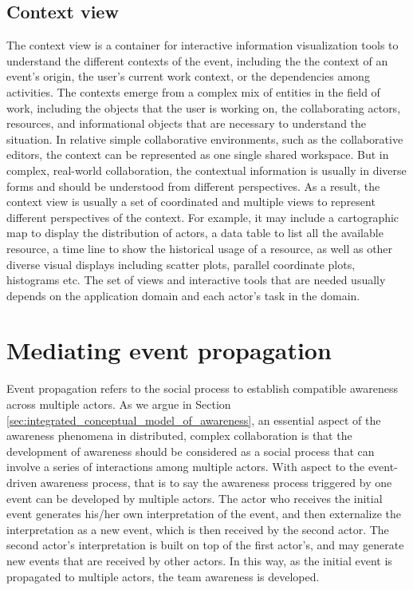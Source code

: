 \subsection{Context view} %
\label{sub:context_view}
The context view is a container for interactive information visualization tools to understand the different contexts of the event, including the the context of an event's origin, the user's current work context, or the dependencies among activities. The contexts emerge from a complex mix of entities in the field of work, including the objects that the user is working on, the collaborating actors, resources, and informational objects that are necessary to understand the situation. In relative simple collaborative environments, such as the collaborative editors, the context can be represented as one single shared workspace. But in complex, real-world collaboration, the contextual information is usually in diverse forms and should be understood from different perspectives. As a result, the context view is usually a set of coordinated and multiple views to represent different perspectives of the context. For example, it may include a cartographic map to display the distribution of actors, a data table to list all the available resource, a time line to show the historical usage of a resource, as well as other diverse visual displays including scatter plots, parallel coordinate plots, histograms etc. The set of views and interactive tools that are needed usually depends on the application domain and each actor's task in the domain.

\section{Mediating event propagation} %
\label{sec:mediating_event_propagation}
Event propagation refers to the social process to establish compatible awareness across multiple actors. As we argue in Section \ref{sec:integrated_conceptual_model_of_awareness}, an essential aspect of the awareness phenomena in distributed, complex collaboration is that the development of awareness should be considered as a social process that can involve a series of interactions among multiple actors. With aspect to the event-driven awareness process, that is to say the awareness process triggered by one event can be developed by multiple actors. The actor who receives the initial event generates his/her own interpretation of the event, and then externalize the interpretation as a new event, which is then received by the second actor. The second actor's interpretation is built on top of the first actor's, and may generate new events that are received by other actors. In this way, as the initial event is propagated to multiple actors, the team awareness is developed.

